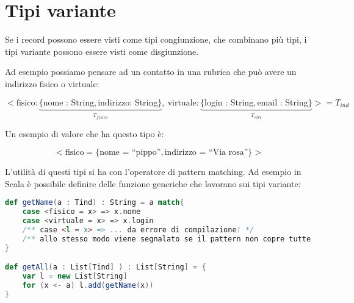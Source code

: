 

\section{Tipi variante}

Se i record possono essere visti come tipi congiunzione, che combinano più tipi, i tipi variante possono essere visti come disgiunzione.

Ad esempio possiamo pensare ad un contatto in una rubrica che può avere un indirizzo fisico o virtuale:

$$
< \text{fisico}: \underbrace{\{ \text{nome : String}, \text{indirizzo: String} \}}_{T_{fisico}} , \: \text{virtuale}: \underbrace{\{ \text{login : String}, \text{email : String} \}}_{T_{virt}} >= T_{ind}
$$

\noindent Un esempio di valore che ha questo tipo è:

$$
< \text{fisico} = \{ \text{nome = ``pippo''}, \text{indirizzo =  ``Via rosa''} \} >
$$

\noindent L'utilità di questi tipi si ha con l'operatore di pattern matching.
Ad esempio in Scala è possibile definire delle funzione generiche che lavorano sui tipi variante:

\begin{lstlisting}[language=Scala, caption=Utilizzo del pattern matching in Scala]
def getName(a : Tind) : String = a match{
	case <fisico = x> => x.nome
	case <virtuale = x> => x.login
	/** case <l = x> => ... da errore di compilazione! */
	/** allo stesso modo viene segnalato se il pattern non copre tutte le possibili etichette */
}

def getAll(a : List[Tind] ) : List[String] = {
	var l = new List[String]
	for (x <- a) l.add(getName(x))
}
\end{lstlisting}

